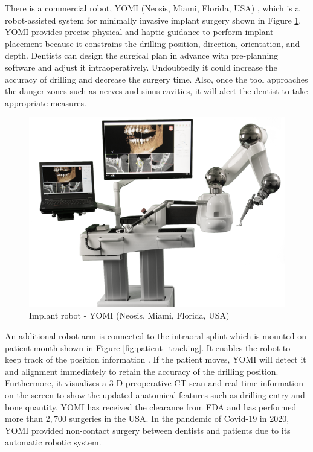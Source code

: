 \par
\vspace{-5mm}
There is a commercial robot, YOMI (Neosis, Miami, Florida, USA) \cite{bolding2021accuracy,BOLDING2021}, which is a robot-assisted system for minimally invasive implant surgery shown in Figure \ref{fig:YOMI}. YOMI provides precise physical and haptic guidance to perform implant placement because it constrains the drilling position, direction, orientation, and depth. Dentists can design the surgical plan in advance with pre-planning software and adjust it intraoperatively. Undoubtedly it could increase the accuracy of drilling and decrease the surgery time. Also,  once the tool approaches the danger zones such as nerves and sinus cavities, it will alert the dentist to take appropriate measures.
\begin{figure}[htbp]
\begin{center}
\includegraphics[width=0.8\linewidth]{Images/YOMI.png}
\caption{Implant robot - YOMI (Neosis, Miami, Florida, USA) }\label{fig:YOMI}
\end{center}
\end{figure}
\par
An additional robot arm is connected to the intraoral splint which is mounted on patient mouth shown in Figure \ref{fig:patient_tracking}. It enables the robot to keep track of the position information \cite{intraoral_splint} . If the patient moves, YOMI will detect it and alignment immediately to retain the accuracy of the drilling position. Furthermore, it visualizes a 3-D preoperative CT scan and real-time information on the screen to show the updated anatomical features such as drilling entry and bone quantity.  YOMI has received the clearance from FDA and has performed more than $2,700$ surgeries in the USA. In the pandemic of Covid-19 in 2020, YOMI provided non-contact surgery between dentists and patients due to its automatic robotic system. 
